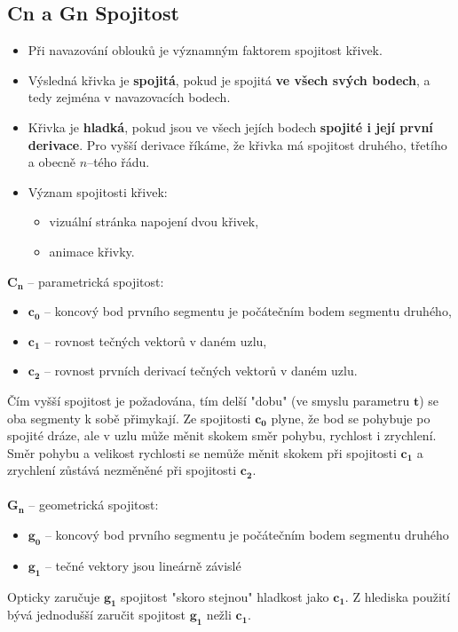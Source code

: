 \subsection{Cn a Gn Spojitost}
\begin{itemize}
\item Při navazování oblouků je významným faktorem spojitost křivek. 
\item Výsledná křivka je \textbf{spojitá}, pokud je spojitá \textbf{ve všech svých bodech}, a tedy zejména v navazovacích bodech. 
\item Křivka je \textbf{hladká}, pokud jsou ve všech jejích bodech \textbf{spojité i její první derivace}. Pro vyšší derivace říkáme, že křivka má spojitost druhého, třetího a obecně $n$--tého řádu.
\item Význam spojitosti křivek:
	\begin{itemize}
	\item vizuální stránka napojení dvou křivek,
	\item animace křivky.
	\end{itemize}
\end{itemize}
$\mathbf{C_n}$ -- parametrická spojitost:
	\begin{itemize}
	\item $\mathbf{c_0}$ -- koncový bod prvního segmentu je počátečním bodem segmentu druhého,	
	\item $\mathbf{c_1}$ -- rovnost tečných vektorů v daném uzlu, 		
	\item $\mathbf{c_2}$ -- rovnost prvních derivací tečných vektorů v daném uzlu.
	\end{itemize}
Čím vyšší spojitost je požadována, tím delší "dobu" (ve smyslu parametru $\mathbf{t}$) se oba segmenty k sobě přimykají. Ze spojitosti $\mathbf{c_0}$ plyne, že bod se pohybuje po spojité dráze, ale v uzlu může měnit skokem směr pohybu, rychlost i zrychlení. Směr pohybu a velikost rychlosti se nemůže měnit skokem při spojitosti $\mathbf{c_1}$ a zrychlení zůstává nezměněné při spojitosti $\mathbf{c_2}$. \\\\
$\mathbf{G_n}$ -- geometrická spojitost:
	\begin{itemize}
		\item $\mathbf{g_0}$ -- koncový bod prvního segmentu je počátečním bodem segmentu druhého
		\item $\mathbf{g_1}$ -- tečné vektory jsou lineárně závislé
	\end{itemize}
Opticky zaručuje $\mathbf{g_1}$ spojitost "skoro stejnou" hladkost jako $\mathbf{c_1}$. Z hlediska použití bývá jednodušší zaručit spojitost $\mathbf{g_1}$ nežli $\mathbf{c_1}$.

